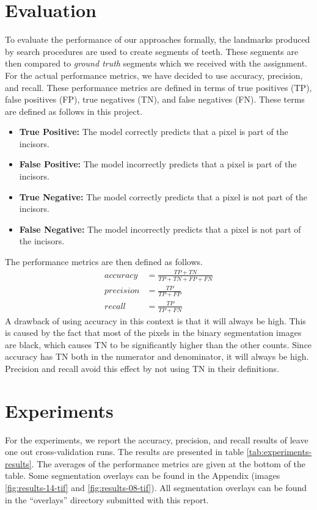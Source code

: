 \documentclass[a4paper]{article}
\begin{document}
\section{Evaluation}
\label{sect:evaluation}
To evaluate the performance of our approaches formally, the landmarks produced by search procedures are used to create segments of teeth.
These segments are then compared to \textit{ground truth} segments which we received with the assignment.
For the actual performance metrics, we have decided to use accuracy, precision, and recall.
These performance metrics are defined in terms of true positives (TP), false positives (FP), true negatives (TN), and false negatives (FN).
These terms are defined as follows in this project.
\begin{itemize}
\item \textbf{True Positive:} The model correctly predicts that a pixel is part of the incisors.
\item \textbf{False Positive:} The model incorrectly predicts that a pixel is part of the incisors.
\item \textbf{True Negative:} The model correctly predicts that a pixel is not part of the incisors.
\item \textbf{False Negative:} The model incorrectly predicts that a pixel is not part of the incisors.
\end{itemize}

The performance metrics are then defined as follows.
\begin{align} 
accuracy &= \frac{TP + TN}{TP + TN + FP + FN} \\ 
precision &= \frac{TP}{TP + FP} \\ 
recall &= \frac{TP}{TP + FN}
\end{align}
A drawback of using accuracy in this context is that it will always be high.
This is caused by the fact that most of the pixels in the binary segmentation images are black, which causes TN to be significantly higher than the other counts.
Since accuracy has TN both in the numerator and denominator, it will always be high.
Precision and recall avoid this effect by not using TN in their definitions.

\section{Experiments}
\label{sect:experiments}
For the experiments, we report the accuracy, precision, and recall results of leave one out cross-validation runs. 
The results are presented in table \ref{tab:experiments-results}. The averages of the performance metrics are given at the bottom of the table.
Some segmentation overlays can be found in the Appendix (images \ref{fig:results-14-tif} and \ref{fig:results-08-tif}).
All segmentation overlays can be found in the ``overlays'' directory submitted with this report.
\end{document}
